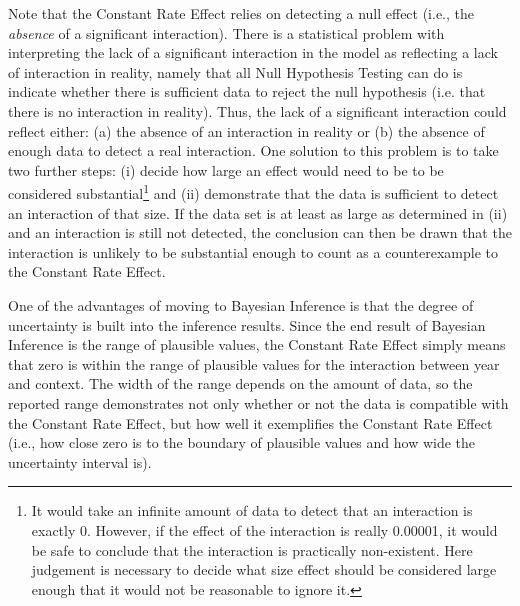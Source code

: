	Note that the Constant Rate Effect relies on detecting a null effect (i.e., the \textit{absence} of a significant interaction). There is a statistical problem with interpreting the lack of a significant interaction in the model as reflecting a lack of interaction in reality, namely that all Null Hypothesis Testing can do is indicate whether there is sufficient data to reject the null hypothesis (i.e. that there is no interaction in reality). Thus, the lack of a significant interaction could reflect either: (a) the absence of an interaction in reality or (b) the absence of enough data to detect a real interaction. One solution to this problem is to take two further steps: (i) decide how large an effect would need to be to be considered substantial\footnote{It would take an infinite amount of data to detect that an interaction is exactly 0. However, if the effect of the interaction is really 0.00001, it would be safe to conclude that the interaction is practically non-existent. Here judgement is necessary to decide what size effect should be considered large enough that it would not be reasonable to ignore it.} and (ii) demonstrate that the data is sufficient to detect an interaction of that size. If the data set is at least as large as determined in (ii) and an interaction is still not detected, the conclusion can then be drawn that the interaction is unlikely to be substantial enough to count as a counterexample to the Constant Rate Effect. 
	
	One of the advantages of moving to Bayesian Inference is that the degree of uncertainty is built into the inference results. Since the end result of Bayesian Inference is the range of plausible values, the Constant Rate Effect simply means that zero is within the range of plausible values for the interaction between year and context. The width of the range depends on the amount of data, so the reported range demonstrates not only whether or not the data is compatible with the Constant Rate Effect, but how well it exemplifies the Constant Rate Effect (i.e., how close zero is to the boundary of plausible values and how wide the uncertainty interval is).


